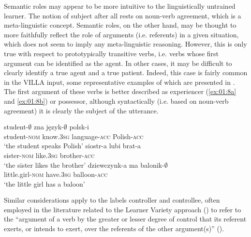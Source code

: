 Semantic roles may appear to be more intuitive to the linguistically untrained learner. The notion of subject after all rests on noun-verb agreement, which is a meta-linguistic concept. Semantic roles, on the other hand, may be thought to more faithfully reflect the role of arguments (i.e. referents) in a given situation, which does not seem to imply any meta-linguistic reasoning. However, this is only true with respect to prototypically transitive verbs, i.e. verbs whose first argument can be identified as the agent. In other cases, it may be difficult to clearly identify a true agent and a true patient. Indeed, this case is fairly common in the VILLA input, some representative examples of which are presented in . The first argument of these verbs is better described as experiencer (\ref{ex:01:8a} and \ref{ex:01:8b}) or possessor, although syntactically (i.e. based on noun-verb agreement) it is clearly the subject of the utterance.

\ea%
    \label{ex:01:8}
    \ea\label{ex:01:8a}
    \gll    student-${\emptyset}$   zna     język-${\emptyset}$   polsk-i\\
            student-\textsc{nom}  know.\textsc{3sg}  language-\textsc{acc}  Polish-\textsc{acc}\\
    \glt    ‘the student speaks Polish’
    \ex\label{ex:01:8b}
    \gll    siostr-a lubi brat-a\\
            sister-\textsc{nom}  like.\textsc{3sg}  brother-\textsc{acc}\\
    \glt    ‘the sister likes the brother’
    \ex\label{ex:01:8c}
    \gll    dziewczynk-a ma balonik-${\emptyset}$\\
            little.girl-\textsc{nom}  have.\textsc{3sg}  balloon-\textsc{acc}\\
    \glt    ‘the little girl has a baloon’
    \z
\z

Similar considerations apply to the labels controller and controllee, often employed in the literature related to the Learner Variety approach (\citealt{KleinPerdue1992, Perdue1993}) to refer to the “argument of a verb by the greater or lesser degree of control that its referent exerts, or intends to exert, over the referents of the other argument(s)” (\citealt[314]{KleinPerdue1997}).

